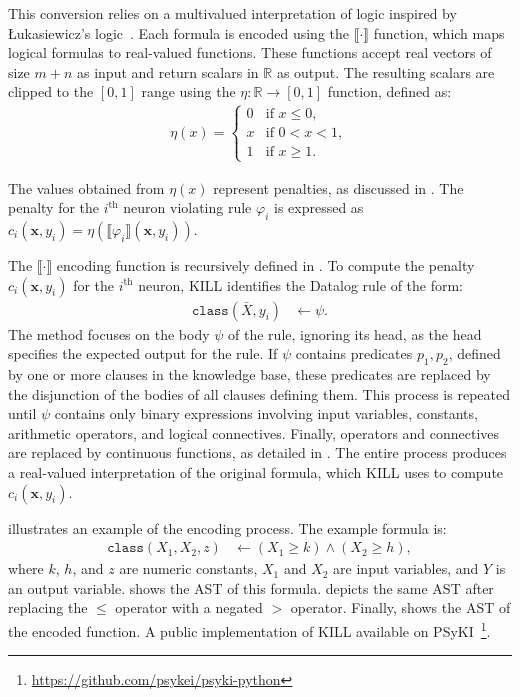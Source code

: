 This conversion relies on a multivalued interpretation of logic inspired by \L{}ukasiewicz's logic~\cite{DBLP:journals/jsyml/Hay63}.
%
Each formula is encoded using the \(\llbracket \cdot \rrbracket\) function, which maps logical formulas to real-valued functions.
%
These functions accept real vectors of size \(m + n\) as input and return scalars in \(\mathbb{R}\) as output.
%
The resulting scalars are clipped to the \([0, 1]\) range using the \(\eta : \mathbb{R} \to [0, 1]\) function, defined as:
%
\begin{align*}
    \eta(x) =
    \begin{cases}
        0 & \text{if } x \leq 0, \\
        x & \text{if } 0 < x < 1, \\
        1 & \text{if } x \geq 1.
    \end{cases}
\end{align*}

The values obtained from \(\eta(x)\) represent penalties, as discussed in .
%
The penalty for the \(i^{\text{th}}\) neuron violating rule \(\varphi_i\) is expressed as \(c_i(\mathbf{x}, y_i) = \eta(\llbracket \varphi_i \rrbracket(\mathbf{x}, y_i))\).

The \(\llbracket \cdot \rrbracket\) encoding function is recursively defined in .
%
To compute the penalty \(c_i(\mathbf{x}, y_i)\) for the \(i^{\text{th}}\) neuron, \gls{KILL} identifies the Datalog rule of the form:
%
\begin{align*}
    \texttt{class}(\bar{X}, y_i) &\leftarrow \psi.
\end{align*}
%
The method focuses on the body \(\psi\) of the rule, ignoring its head, as the head specifies the expected output for the rule.
%
If \(\psi\) contains predicates \(p_1, p_2\), defined by one or more clauses in the knowledge base, these predicates are replaced by the disjunction of the bodies of all clauses defining them.
%
This process is repeated until \(\psi\) contains only binary expressions involving input variables, constants, arithmetic operators, and logical connectives.
%
Finally, operators and connectives are replaced by continuous functions, as detailed in .
%
The entire process produces a real-valued interpretation of the original formula, which \gls{KILL} uses to compute \(c_i(\mathbf{x}, y_i)\).

 illustrates an example of the encoding process.
%
The example formula is:
%
\begin{align*}
    \texttt{class}(X_1, X_2, z) &\leftarrow (X_1 \geq k) \land (X_2 \geq h),
\end{align*}
%
where \(k\), \(h\), and \(z\) are numeric constants, \(X_1\) and \(X_2\) are input variables, and \(Y\) is an output variable.
%
 shows the \gls{AST} of this formula.
%
 depicts the same \gls{AST} after replacing the \(\leq\) operator with a negated \(>\) operator.
%
Finally,  shows the \gls{AST} of the encoded function.
%
A public implementation of \gls{KILL} available on \gls{PSyKI}~\cite{DBLP:conf/atal/MagniniCO22}\footnote{\label{foot:psyki}\url{https://github.com/psykei/psyki-python}}.


